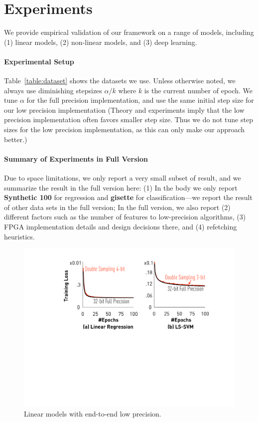 \documentclass{article}
\begin{document}
\vspace{-0.5em}
\section{Experiments} \label{sec:exp}

\vspace{-0.5em}
We provide empirical validation of
our framework on a range of
models, including
(1) linear models, (2) non-linear models,
and (3) deep learning.

\vspace{-1em}
\paragraph{Experimental Setup} 
Table~\ref{table:dataset} shows the 
datasets we use. 
Unless otherwise noted, we always
use diminishing stepsizes $\alpha/k$
where $k$ is the current number of
epoch. We tune 
$\alpha$ for the full precision
implementation, and use the
same initial step size for 
our low precision 
implementation (Theory and
experiments imply that the low precision
implementation often favors smaller step size. 
Thus we do not tune step sizes for the low precision 
implementation, as this can only make our 
approach better.) 

\vspace{-1em}
\paragraph*{Summary of Experiments in Full Version}
Due to space limitations, we only
report a very small subset of result, and
we summarize the result in the full
version here: (1) In the body we only report
{\bf Synthetic 100} for regression and 
{\bf gisette} for classification---we
report the result of other data sets 
in the full version; In the
full version, we also report (2) different
factors such as the number of features
to low-precision algorithms, (3) FPGA
implementation details and design
decisions there, and (4) refetching
heuristics.





\begin{figure}[t]
\centering
\includegraphics[width=0.7\columnwidth]{final-experiments/linearmodel} 
\vspace{-1em}
\caption{Linear models with end-to-end low precision.}
\label{fig:convergence}
\end{figure}
\end{document}
